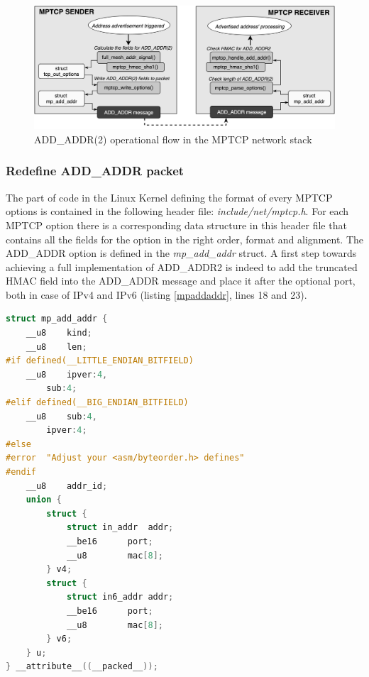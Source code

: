 \begin{figure}[!htb]
\centering
\includegraphics[width=\textwidth]{images/addr2stack}
\caption{ADD\_ADDR(2) operational flow in the MPTCP network stack}
\label{fig:addr2stack}
\end{figure}

\subsubsection{Redefine ADD\_ADDR packet}
The part of code in the Linux Kernel defining the format of every MPTCP options is contained in the following header file: \textit{include/net/mptcp.h}. For each MPTCP option there is a corresponding data structure in this header file that contains all the fields for the option in the right order, format and alignment. The ADD\_ADDR option is defined in the \textit{mp\_add\_addr} struct. A first step towards achieving a full implementation of ADD\_ADDR2 is indeed to add the truncated HMAC field into the ADD\_ADDR message and place it after the optional port, both in case of IPv4 and IPv6 (listing \ref{mpaddaddr}, lines 18 and 23).

\begin{lstlisting}[language=c, caption=\textit{mp\_add\_addr} struct, label=mpaddaddr]
struct mp_add_addr {
	__u8	kind;
	__u8	len;
#if defined(__LITTLE_ENDIAN_BITFIELD)
	__u8	ipver:4,
		sub:4;
#elif defined(__BIG_ENDIAN_BITFIELD)
	__u8	sub:4,
		ipver:4;
#else
#error	"Adjust your <asm/byteorder.h> defines"
#endif
	__u8	addr_id;
	union {
		struct {
			struct in_addr	addr;
			__be16		port;
			__u8		mac[8];
		} v4;
		struct {
			struct in6_addr	addr;
			__be16		port;
			__u8		mac[8];
		} v6;
	} u;
} __attribute__((__packed__));
\end{lstlisting}

